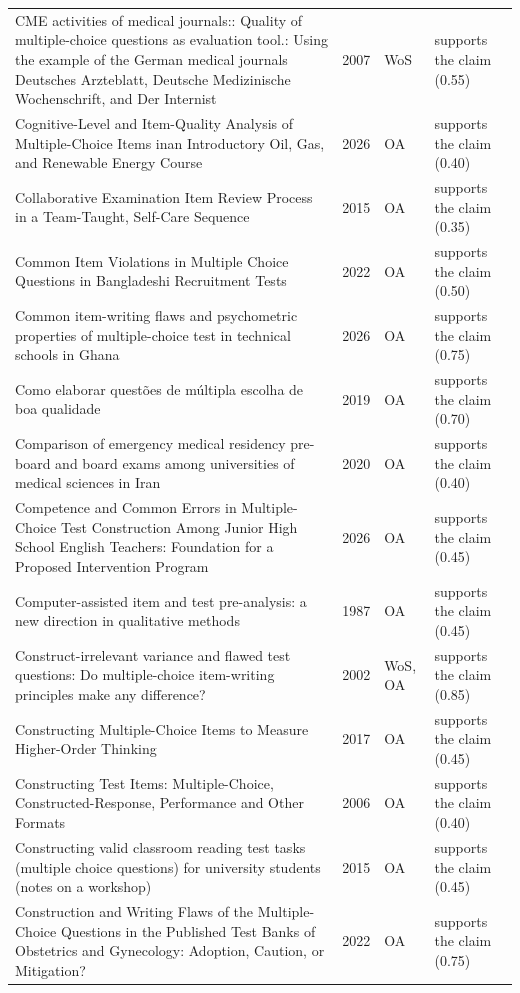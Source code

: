 \begin{longtable}{@{}%
  >{\raggedright\arraybackslash}p{}c%
  >{\raggedright\arraybackslash}p{}%
  >{\raggedright\arraybackslash}p{}@{}}
CME activities of medical journals:: Quality of multiple-choice questions as evaluation tool.: Using the example of the German medical journals Deutsches Arzteblatt, Deutsche Medizinische Wochenschrift, and Der Internist & 2007 & WoS & supports the claim (0.55) \\
Cognitive-Level and Item-Quality Analysis of Multiple-Choice Items inan Introductory Oil, Gas, and Renewable Energy Course & 2026 & OA & supports the claim (0.40) \\
Collaborative Examination Item Review Process in a Team-Taught, Self-Care Sequence & 2015 & OA & supports the claim (0.35) \\
Common Item Violations in Multiple Choice Questions in Bangladeshi Recruitment Tests & 2022 & OA & supports the claim (0.50) \\
Common item-writing flaws and psychometric properties of multiple-choice test in technical schools in Ghana & 2026 & OA & supports the claim (0.75) \\
Como elaborar questões de múltipla escolha de boa qualidade & 2019 & OA & supports the claim (0.70) \\
Comparison of emergency medical residency pre-board and board exams among universities of medical sciences in Iran & 2020 & OA & supports the claim (0.40) \\
Competence and Common Errors in Multiple-Choice Test Construction Among Junior High School English Teachers: Foundation for a Proposed Intervention Program & 2026 & OA & supports the claim (0.45) \\
Computer-assisted item and test pre-analysis: a new direction in qualitative methods & 1987 & OA & supports the claim (0.45) \\
Construct-irrelevant variance and flawed test questions: Do multiple-choice item-writing principles make any difference? & 2002 & WoS, OA & supports the claim (0.85) \\
Constructing Multiple-Choice Items to Measure Higher-Order Thinking & 2017 & OA & supports the claim (0.45) \\
Constructing Test Items: Multiple-Choice, Constructed-Response, Performance and Other Formats & 2006 & OA & supports the claim (0.40) \\
Constructing valid classroom reading test tasks (multiple choice questions) for university students (notes on a workshop) & 2015 & OA & supports the claim (0.45) \\
Construction and Writing Flaws of the Multiple-Choice Questions in the Published Test Banks of Obstetrics and Gynecology: Adoption, Caution, or Mitigation? & 2022 & OA & supports the claim (0.75) \\

\end{longtable}

